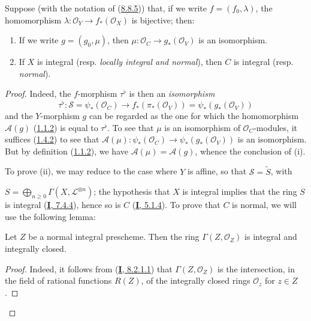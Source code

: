 \begin{proposition}[8.8.6]
\label{II.8.8.6}
Suppose (with the notation of \textup{(\hyperref[II.8.8.5]{8.8.5})}) that, if we
write $f=(f_0,\lambda)$, the homomorphism
$\lambda:\mathcal{O}_Y\to f_*(\mathcal{O}_X)$ is bijective; then:
\begin{enumerate}
  \item[\rm{(i)}] If we write $g=(g_0,\mu)$, then
  $\mu:\mathcal{O}_C\to g_*(\mathcal{O}_V)$ is an isomorphism.
  \item[\rm{(ii)}] If $X$ is integral \textup{(resp. \emph{locally integral and normal})},
  then $C$ is integral \textup{(resp. \emph{normal})}.
\end{enumerate}
\end{proposition}

\begin{proof}
Indeed, the $f$-morphism $\tau^\flat$ is then an \emph{isomorphism}
\[
  \tau^\flat:\mathcal{S}=\psi_*(\mathcal{O}_C)
  \longrightarrow f_*(\pi_*(\mathcal{O}_V))
  =\psi_*(g_*(\mathcal{O}_V))
\]
and the $Y$-morphism $g$ can be regarded as the one for which the
homomorphism $\mathcal{A}(g)$
(\hyperref[II.1.1.2]{1.1.2}) is equal to $\tau^\flat$. To see that
$\mu$ is an isomorphism of $\mathcal{O}_C$-modules, it suffices
(\hyperref[II.1.4.2]{1.4.2}) to see that $\mathcal{A}(\mu):\psi_*(\mathcal{O}_C)\longrightarrow\psi_*(g_*(\mathcal{O}_V))$
is an isomorphism. But by definition
(\hyperref[II.1.1.2]{1.1.2}), we have
$\mathcal{A}(\mu)=\mathcal{A}(g)$, whence the conclusion of (i).

To prove (ii), we may reduce to the case where $Y$ is affine, so that
$\mathcal{S}=\widetilde{S}$, with

$S=\bigoplus_{n\geqslant 0}\Gamma(X,\mathcal{L}^{\otimes n})$;
the hypothesis that $X$ is integral implies that the ring $S$ is integral
(\hyperref[I.7.4.4]{\textbf{I}, 7.4.4}), hence so is $C$
(\hyperref[I.5.1.4]{\textbf{I}, 5.1.4}). To prove that $C$ is normal, we
will use the following lemma:

\begin{lemma}[8.8.6.1]
\label{II.8.8.6.1}
Let $Z$ be a normal integral prescheme. Then the ring
$\Gamma(Z,\mathcal{O}_Z)$ is integral and integrally closed.
\end{lemma}

\begin{proof}
Indeed, it follows from
(\hyperref[I.8.2.1.1]{\textbf{I}, 8.2.1.1}) that
$\Gamma(Z,\mathcal{O}_Z)$ is the intersection, in the field of rational
functions $R(Z)$, of the integrally closed rings $\mathcal{O}_z$ for
$z\in Z$.
\end{proof}


\end{proof}
